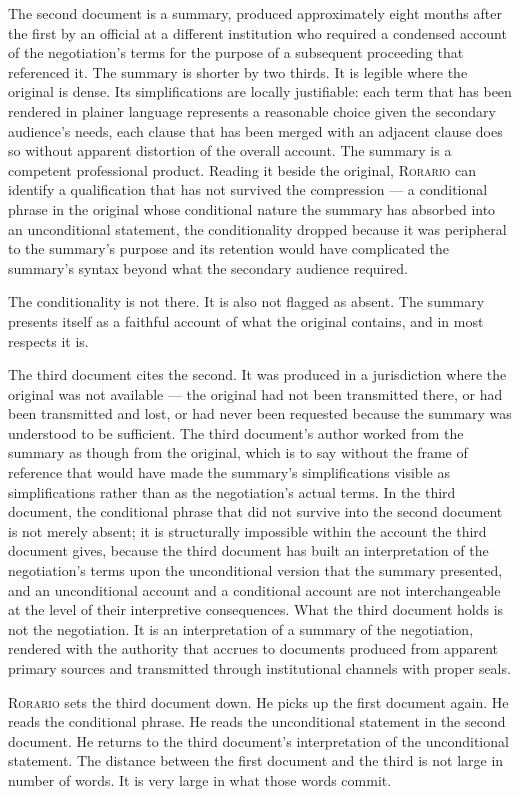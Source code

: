 \documentclass[12pt, oneside]{article}
\newenvironment{action}{%
  \vspace{0.6em}%
  \noindent\ignorespaces%
}{%
  \par\vspace{0.6em}%
}
\begin{document}
\begin{action}
The second document is a summary, produced approximately eight months after the first by an official at a different institution who required a condensed account of the negotiation's terms for the purpose of a subsequent proceeding that referenced it. The summary is shorter by two thirds. It is legible where the original is dense. Its simplifications are locally justifiable: each term that has been rendered in plainer language represents a reasonable choice given the secondary audience's needs, each clause that has been merged with an adjacent clause does so without apparent distortion of the overall account. The summary is a competent professional product. Reading it beside the original, \textsc{Rorario} can identify a qualification that has not survived the compression --- a conditional phrase in the original whose conditional nature the summary has absorbed into an unconditional statement, the conditionality dropped because it was peripheral to the summary's purpose and its retention would have complicated the summary's syntax beyond what the secondary audience required.

The conditionality is not there. It is also not flagged as absent. The summary presents itself as a faithful account of what the original contains, and in most respects it is.
\end{action}

\begin{action}
The third document cites the second. It was produced in a jurisdiction where the original was not available --- the original had not been transmitted there, or had been transmitted and lost, or had never been requested because the summary was understood to be sufficient. The third document's author worked from the summary as though from the original, which is to say without the frame of reference that would have made the summary's simplifications visible as simplifications rather than as the negotiation's actual terms. In the third document, the conditional phrase that did not survive into the second document is not merely absent; it is structurally impossible within the account the third document gives, because the third document has built an interpretation of the negotiation's terms upon the unconditional version that the summary presented, and an unconditional account and a conditional account are not interchangeable at the level of their interpretive consequences. What the third document holds is not the negotiation. It is an interpretation of a summary of the negotiation, rendered with the authority that accrues to documents produced from apparent primary sources and transmitted through institutional channels with proper seals.

\textsc{Rorario} sets the third document down. He picks up the first document again. He reads the conditional phrase. He reads the unconditional statement in the second document. He returns to the third document's interpretation of the unconditional statement. The distance between the first document and the third is not large in number of words. It is very large in what those words commit.
\end{action}
\end{document}
